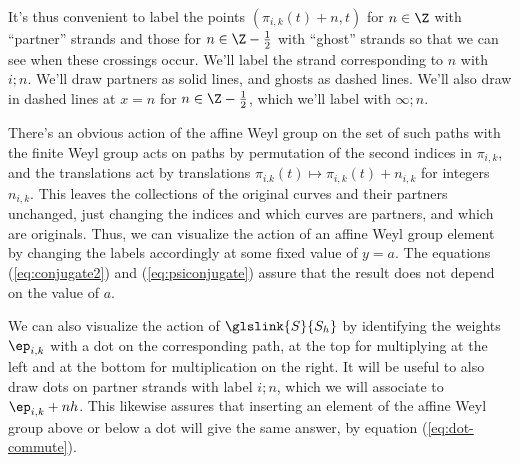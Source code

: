 It's thus convenient to label the points $(\pi_{i,k}(t)+n,t)$ for
$n\in \Z$ with ``partner'' strands and those for $n\in \Z-\frac{1}{2}$ with ``ghost'' strands so that we can see when these
crossings occur.  We'll label the strand corresponding to $n$ with $i;n$.  We'll draw partners as solid lines,
and ghosts as dashed lines.  We'll also draw in dashed
lines at $x=n$ for $n\in \Z-\frac{1}{2}$, which we'll label with
$\infty;n$.


There's an obvious action of the affine Weyl group on the set of such
paths with the finite Weyl group acts on paths by permutation of
the second indices in $\pi_{i,k}$, and the translations act by
translations $\pi_{i.k}(t)\mapsto \pi_{i,k}(t)+n_{i,k}$ for integers
$n_{i,k}$.  This leaves the collections of the original curves and
their partners unchanged, just changing the indices and which curves
are partners, and which are originals. Thus, we can visualize the
action of an affine Weyl group element by changing the labels
accordingly at some fixed value of $y=a$.  The equations
(\ref{eq:conjugate2}) and (\ref{eq:psiconjugate}) assure that the
result does not depend on the value of $a$.  

We can also visualize the action of $\glslink{S}{S_h}$ by identifying the weights
$\ep_{i,k}$ with a dot on the corresponding path, at the top for
multiplying at the left and at the bottom for multiplication on the
right.  It will be useful to also draw dots on partner strands with
label $i;n$, which we will associate to $\ep_{i,k}+nh$.  This likewise
assures that inserting an element of the affine Weyl group above or
below a dot will give the same answer, by equation (\ref{eq:dot-commute}).

